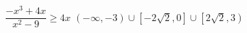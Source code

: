 {$\dfrac{-x^{3} + 4x}{x^{2} - 9} \geq 4x$}
{$(-\infty, -3) \cup \left[-2\sqrt{2}, 0\right] \cup \left[2\sqrt{2}, 3\right)$}